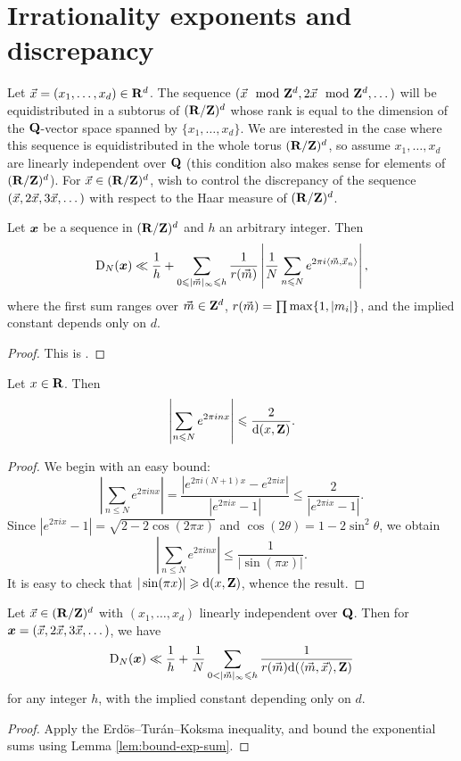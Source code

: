 \section{Irrationality exponents and discrepancy}

Let $\vec{x}=(x_1,\dots,x_d)\in \mathbf{R}^d$. The sequence 
$(\vec{x}\mod {\mathbf{Z}}^d,2\vec{x}\mod{\mathbf{Z}}^d,\dots)$ will be equidistributed in a subtorus of 
$(\mathbf{R}/\mathbf{Z})^d$ whose rank is equal to the dimension of the $\mathbf{Q}$-vector space 
spanned by $\{x_1,\dots,x_d\}$. We are interested in the case where this 
sequence is equidistributed in the whole torus $(\mathbf{R}/\mathbf{Z})^d$, so assume 
$x_1,\dots,x_d$ are linearly independent over $\mathbf{Q}$ (this condition also 
makes sense for elements of $(\mathbf{R}/\mathbf{Z})^d$). For $\vec{x}\in (\mathbf{R}/\mathbf{Z})^d$, wish 
to control the discrepancy of the sequence $(\vec{x},2\vec{x},3\vec{x},\dots)$ with respect 
to the Haar measure of $(\mathbf{R}/\mathbf{Z})^d$. 

\begin{theorem}
Let ${\boldsymbol x}$ be a sequence in $(\mathbf{R}/\mathbf{Z})^d$ and $h$ an arbitrary integer. Then 
\[
	\operatorname{D}_N({\boldsymbol x}) \ll \frac 1 h + \sum_{0\leqslant |\vec{m}|_\infty \leqslant h} \frac{1}{r(\vec{m})} \left| \frac 1 N \sum_{n\leqslant N} e^{2\pi i \langle \vec{m},\vec{x}_n\rangle}\right| ,
\]
where the first sum ranges over $\vec{m}\in \mathbf{Z}^d$, 
$r(\vec{m}) = \prod \max\{1,|m_i|\}$, and the implied constant depends only on $d$. 
\end{theorem}
\begin{proof}
This is \cite[Th.~1.21]{drmota-tichy-1997}. 
\end{proof}

\begin{lemma}\label{lem:bound-exp-sum}
Let $x\in \mathbf{R}$. Then 
\[
	\left| \sum_{n\leqslant N} e^{2\pi i n x}\right| \leqslant \frac{2}{\mathrm{d}(x, \mathbf{Z})} .
\]
\end{lemma}
\begin{proof}
We begin with an easy bound: 
\[
	\left| \sum_{n\leqslant N} e^{2\pi i n x}\right| = \frac{|e^{2\pi i (N+1) x} - e^{2\pi i x}|}{|e^{2\pi i x} - 1|} \leqslant \frac{2}{|e^{2\pi i x} - 1|} .
\]
Since $|e^{2\pi i x} - 1| = \sqrt{2-2\cos(2\pi x)}$ and 
$\cos(2\theta) = 1-2\sin^2\theta$, we obtain 
\[
	\left|\sum_{n\leqslant N} e^{2\pi i n x}\right| \leqslant \frac{1}{|\sin(\pi x)|} .
\]
It is easy to check that $|\sin(\pi x)| \geqslant \mathrm{d}(x,\mathbf{Z})$, whence the result.  
\end{proof}

\begin{corollary}\label{cor:bound-disc-distance}
Let $\vec{x}\in (\mathbf{R}/\mathbf{Z})^d$ with $(x_1,\dots,x_d)$ linearly independent over $\mathbf{Q}$. 
Then for ${\boldsymbol x}=(\vec{x},2\vec{x},3\vec{x},\dots)$, we have 
\[
	\D_N(\bx) \ll \frac 1 h + \frac 1 N \sum_{0<|\vm|_\infty \leqslant h} \frac{1}{r(\vm) \dd(\langle \vm,\vx\rangle,\bZ)} 
\]
for any integer $h$, with the implied constant depending only on $d$. 
\end{corollary}
\begin{proof}
Apply the Erd\"os--Tur\'an--Koksma inequality, and bound the exponential sums 
using Lemma \ref{lem:bound-exp-sum}. 
\end{proof}

